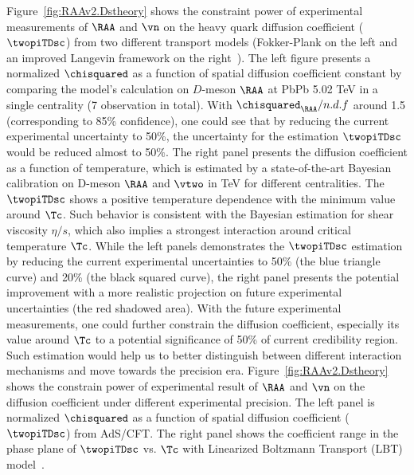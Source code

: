 Figure~\ref{fig:RAAv2.Dstheory} shows the constraint power of experimental measurements of  $\RAA$ and $\vn$ on the heavy quark diffusion coefficient ($\twopiTDsc$) from two different transport models (Fokker-Plank on the left and an improved Langevin framework on the right~\cite{PhysRevC.97.014907}). The left figure presents a normalized $\chisquared$ as a function of spatial diffusion coefficient constant by comparing the model's calculation on $D$-meson $\RAA$ at PbPb 5.02 TeV in a single centrality (7 observation in total). With $\chisquared_{\RAA}/n.d.f$ around 1.5 (corresponding to 85\% confidence), one could see that by reducing the current experimental uncertainty to 50\%, the uncertainty for the estimation $\twopiTDsc$ would be reduced almost to 50$\%$. The right panel presents the diffusion coefficient as a function of temperature, which is estimated by a state-of-the-art Bayesian calibration on D-meson $\RAA$ and $\vtwo$ in  TeV for different centralities. The $\twopiTDsc$ shows a positive temperature dependence with the minimum value around $\Tc$. Such behavior is consistent with the Bayesian estimation for shear viscosity $\eta/s$, which also implies a strongest interaction around critical temperature $\Tc$. While the left panels demonstrates the $\twopiTDsc$ estimation by reducing the current experimental uncertainties to 50\% (the blue triangle curve) and 20\% (the black squared curve), the right panel presents the potential improvement with a more realistic projection on future experimental uncertainties (the red shadowed area). With the future experimental measurements, one could further constrain the diffusion coefficient, especially its value around $\Tc$ to a potential significance of 50\% of current credibility region. Such estimation would help us to better distinguish between different interaction mechanisms and move towards the precision era. Figure~\ref{fig:RAAv2.Dstheory} shows the constrain power of experimental result of $\RAA$ and $\vn$ on the diffusion coefficient under different experimental precision. The left panel is normalized $\chisquared$ as a function of spatial diffusion coefficient ($\twopiTDsc$) from AdS/CFT. The right panel shows the coefficient range in the phase plane of $\twopiTDsc$ vs. $\Tc$ with Linearized Boltzmann Transport (LBT) model~\cite{PhysRevC.94.014909}.



